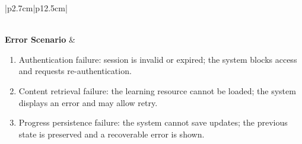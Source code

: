 \begin{table}[H]
\begin{tabular}{|p{2.7cm}|p{12.5cm}|}
\begin{minipage}[t]{\linewidth}
\begin{enumerate}[topsep=0pt,itemsep=1pt,parsep=0pt,partopsep=0pt]
                                      \end{enumerate}
                                  \end{minipage} \\
        \hline
        \textbf{Error Scenario} & \begin{minipage}[t]{\linewidth}
            \begin{enumerate}[topsep=0pt,itemsep=1pt,parsep=0pt,partopsep=0pt]
                \item Authentication failure: session is invalid or expired; the system blocks access and requests re-authentication.
                \item Content retrieval failure: the learning resource cannot be loaded; the system displays an error and may allow retry.
                \item Progress persistence failure: the system cannot save updates; the previous state is preserved and a recoverable error is shown.
            \end{enumerate}
        \end{minipage} \\
        \hline
    \end{tabular}
    \label{tab:eng-resume-training}
\end{table}

